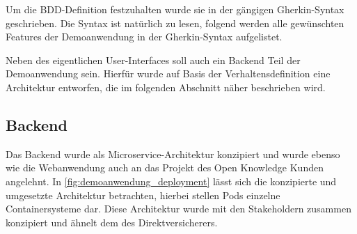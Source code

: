 Um die BDD-Definition festzuhalten wurde sie in der gängigen Gherkin-Syntax \cite{Gherkin} geschrieben. Die Syntax ist natürlich zu lesen, folgend werden alle gewünschten Features der Demoanwendung in der Gherkin-Syntax aufgelistet.











Neben des eigentlichen User-Interfaces soll auch ein Backend Teil der Demoanwendung sein. Hierfür wurde auf Basis der Verhaltensdefinition eine Architektur entworfen, die im folgenden Abschnitt näher beschrieben wird.

\subsection{Backend}

Das Backend wurde als Microservice-Architektur konzipiert und wurde ebenso wie die Webanwendung auch an das Projekt des Open Knowledge Kunden angelehnt. In \autoref{fig:demoanwendung_deployment} lässt sich die konzipierte und umgesetzte Architektur betrachten, hierbei stellen Pods einzelne Containersysteme dar. Diese Architektur wurde mit den Stakeholdern zusammen konzipiert und ähnelt dem des Direktversicherers.

